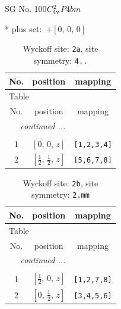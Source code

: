 \documentclass[fleqn,8pt]{jsarticle}
\begin{document}
\setcounter{MaxMatrixCols}{32}

\renewcommand{\tablename}{Table~}
\renewcommand{\figurename}{Figure~}
\begin{center}
\LARGE
SG No. 100\quad$C_{\rm 4v}^{2}$\quad$P4bm$\quad[ tetragonal ]
\end{center}
* plus set:\,\,\,$+\left[ 0,\, 0,\, 0 \right]$
\renewcommand{\arraystretch}{1.2}
\begin{longtable}{ccc}
\caption{Wyckoff site: {\tt 2a}, site symmetry: {\tt 4..}}
 \\
 \hline \hline
No. & position & mapping \\ \hline \endfirsthead

\multicolumn{2}{l}{\tablename\ \thetable{}} \\
 \hline \hline
No. & position & mapping \\ \hline \endhead

 \hline \hline
\multicolumn{2}{r}{\footnotesize\it continued ...} \\ \endfoot

 \hline \hline
\multicolumn{2}{r}{} \\ \endlastfoot

1 & $\left[ 0,\, 0,\, z \right]$ & {\tt [1,2,3,4]} \\ \hline
2 & $\left[ \frac{1}{2},\, \frac{1}{2},\, z \right]$ & {\tt [5,6,7,8]} \\
\end{longtable}
\renewcommand{\arraystretch}{1.2}
\begin{longtable}{ccc}
\caption{Wyckoff site: {\tt 2b}, site symmetry: {\tt 2.mm}}
 \\
 \hline \hline
No. & position & mapping \\ \hline \endfirsthead

\multicolumn{2}{l}{\tablename\ \thetable{}} \\
 \hline \hline
No. & position & mapping \\ \hline \endhead

 \hline \hline
\multicolumn{2}{r}{\footnotesize\it continued ...} \\ \endfoot

 \hline \hline
\multicolumn{2}{r}{} \\ \endlastfoot

1 & $\left[ \frac{1}{2},\, 0,\, z \right]$ & {\tt [1,2,7,8]} \\ \hline
2 & $\left[ 0,\, \frac{1}{2},\, z \right]$ & {\tt [3,4,5,6]} \\
\end{longtable}
\end{document}
